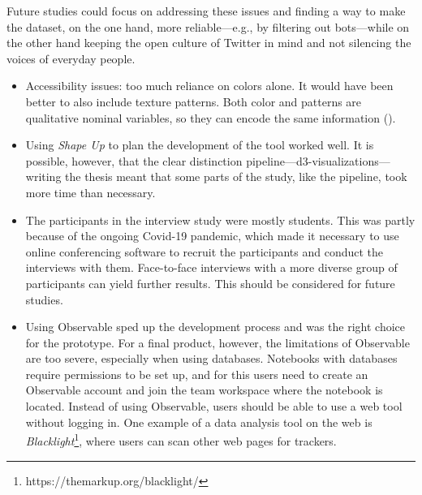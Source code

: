 Future studies could focus on addressing these issues and finding a way to make the dataset, on the one hand, more reliable---e.g., by filtering out bots---while on the other hand keeping the open culture of Twitter in mind and not silencing the voices of everyday people.

\begin{itemize}
    \item Accessibility issues: too much reliance on colors alone. It would have been better to also include texture patterns. Both color and patterns are qualitative nominal variables, so they can encode the same information (\cite[1860]{bornerDataVisualizationLiteracy2019}).
    \item Using \emph{Shape Up} to plan the development of the tool worked well. It is possible, however, that the clear distinction pipeline---d3-visualizations---writing the thesis meant that some parts of the study, like the pipeline, took more time than necessary.
    \item The participants in the interview study were mostly students. This was partly because of the ongoing Covid-19 pandemic, which made it necessary to use online conferencing software to recruit the participants and conduct the interviews with them. Face-to-face interviews with a more diverse group of participants can yield further results. This should be considered for future studies.
    \item Using Observable sped up the development process and was the right choice for the prototype. For a final product, however, the limitations of Observable are too severe, especially when using databases. Notebooks with databases require permissions to be set up, and for this users need to create an Observable account and join the team workspace where the notebook is located. Instead of using Observable, users should be able to use a web tool without logging in. One example of a data analysis tool on the web is \emph{Blacklight}\footnote{https://themarkup.org/blacklight/}, where users can scan other web pages for trackers.
\end{itemize}
